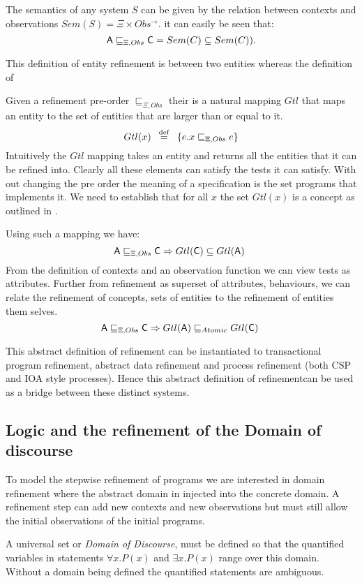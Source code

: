 The semantics of any system $S$ can be given by the relation between contexts and observations $Sem(S) = \Xi\times Obs^{\rightarrow}$. it can easily be seen that:
$$
{\sf A} \sqsubseteq_{\Xi, Obs} {\sf  C} =   Sem(C) \subseteq Sem(C)).
$$

This definition of entity refinement is between two entities whereas the definition of 

Given a refinement pre-order $\sqsubseteq_{\Xi,Obs}$ their is a natural  mapping  $Gtl$ that maps an  entity to the set of entities that are larger than or equal to it. 
$$ Gtl(x)  \hspace*{0.5em} \stackrel{\mathrm{def}}{=} \hspace*{0.5em} \{e . x \sqsubseteq_{\Xi,Obs} e \}$$
Intuitively the $Gtl$ mapping takes an entity and returns all the entities that it can be refined into. Clearly all these elements can satisfy the tests it can satisfy. With out changing the pre order  the meaning of a specification is the set programs that implements it.
We need to establish that for all $x$ the set $ Gtl(x)$ is a concept as outlined in .


Using such a mapping we have:
$${\sf A}\sqsubseteq_{\Xi,Obs}{\sf  C} \Rightarrow   Gtl({\sf C})\subseteq Gtl({\sf A})\ $$
From the definition of contexts and an observation function we can view tests as attributes. Further  from refinement as superset of attributes, behaviours, we can relate the  refinement of concepts, sets of entities to the refinement of entities them selves.
$${\sf A}\sqsubseteq_{\Xi,Obs}{\sf  C} \Rightarrow   Gtl({\sf A})\sqsubseteq_{Atomic} Gtl({\sf C})\ $$

This abstract definition of refinement can be instantiated to transactional program refinement, abstract data refinement and process refinement (both CSP and IOA style processes). Hence this abstract definition of refinementcan be used  as a bridge between these distinct systems.

\subsection{Logic and the refinement of the Domain of discourse}\label{sec:DofD}


 To model the stepwise refinement of programs we are interested in domain refinement where the abstract domain in injected into the concrete domain. A refinement step can add new contexts and new observations but must still allow the initial observations of the initial programs.

A universal set or \emph{Domain of Discourse}, must be defined  so that the quantified  variables in statements $\forall x. P(x)$ and $\exists x. P(x)$ range over this domain. Without  a domain being defined the quantified statements are ambiguous.



